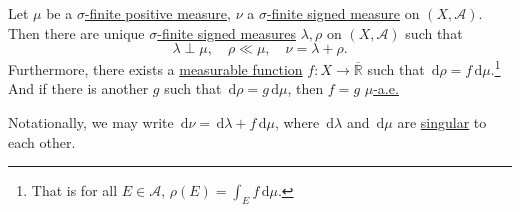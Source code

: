 \begin{theorem}\label{thm:Lebesgue-Radon-Nikodym-theorem}
	Let \(\mu\) be a \hyperref[def:finite-signed-measure]{\(\sigma\)-finite positive measure}, \(\nu\) a \hyperref[def:finite-signed-measure]{\(\sigma\)-finite signed measure}
	on \((X, \mathcal{A})\). Then there are unique \hyperref[def:finite-signed-measure]{\(\sigma\)-finite signed measures} \(\lambda,\rho\) on \((X, \mathcal{A})\)
	such that
	\[
		\lambda \perp \mu, \quad \rho \ll \mu, \quad \nu = \lambda + \rho.
	\]
	Furthermore, there exists a \hyperref[def:measurable-function]{measurable function} \(f \colon X \to \overline{\mathbb{R}}\)
	such that \(\,\mathrm{d} \rho = f \,\mathrm{d} \mu\).\footnote{That is for all \(E \in \mathcal{A}\), \(\rho(E) = \int_E f \,\mathrm{d} \mu\).}
	And if there is another \(g\) such that \(\,\mathrm{d} \rho = g \,\mathrm{d} \mu\), then \(f = g\) \hyperref[def:mu-almost-everywhere]{\(\mu\)-a.e.}
\end{theorem}
\begin{remark}
	Notationally, we may write \(\,\mathrm{d} \nu = \,\mathrm{d} \lambda + f \,\mathrm{d} \mu\), where \(\,\mathrm{d} \lambda\)
	and \(\,\mathrm{d} \mu\) are \hyperref[def:singular]{singular} to each other.
\end{remark}

